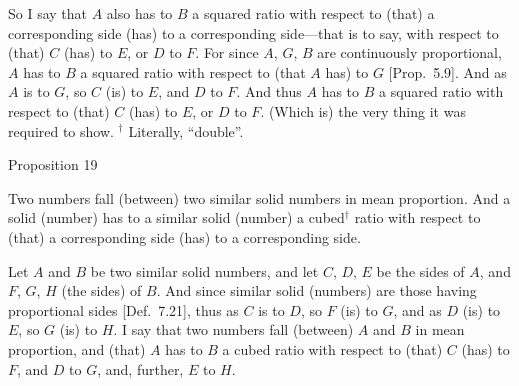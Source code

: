So I say that $A$ also has to $B$ a squared ratio with respect to (that)
a corresponding side (has) to a corresponding side---that is to say, with respect to (that) $C$ (has) to $E$, or $D$ to $F$. For since $A$, $G$, $B$
are continuously proportional, $A$ has to $B$ a squared ratio
with respect to (that $A$ has) to $G$ [Prop.~5.9].
And  as $A$ is to $G$, so $C$ (is) to $E$, and $D$ to $F$.
And thus $A$ has to $B$ a squared ratio with respect to (that)
$C$ (has) to $E$, or $D$ to $F$. (Which is) the very thing it was required to
show.
{\footnotesize\noindent$^\dag$  Literally, ``double''.}


\begin{center}
{\large Proposition 19}
\end{center}

Two numbers fall (between)
two similar solid numbers in mean proportion. And a solid (number) has to a similar solid (number) a cubed$^\dag$ ratio with respect to
(that) a corresponding side (has) to a corresponding side.

\epsfysize=1.9in
\centerline{}

Let $A$ and $B$ be two similar solid numbers, and let $C$, $D$, $E$ be the sides of $A$, and $F$, $G$, $H$ (the sides) of $B$. And
since similar solid (numbers) are those having proportional sides [Def.~7.21], thus as $C$ is to $D$, so $F$
(is) to $G$, and as $D$ (is) to $E$, so $G$ (is) to $H$. I say that two
numbers  fall  (between) $A$ and $B$ in mean proportion, and (that) $A$
has to $B$ a cubed ratio with respect to (that) $C$ (has) to $F$, and
$D$ to $G$, and, further, $E$ to $H$.

